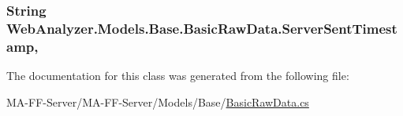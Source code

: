 \subsubsection[{Server\+Sent\+Timestamp}]{\setlength{\rightskip}{0pt plus 5cm}String Web\+Analyzer.\+Models.\+Base.\+Basic\+Raw\+Data.\+Server\+Sent\+Timestamp\hspace{0.3cm}{\ttfamily [get]}, {\ttfamily [set]}}\label{class_web_analyzer_1_1_models_1_1_base_1_1_basic_raw_data_a21d2fe8ffde6c6af33eef4e81922eecf}


The documentation for this class was generated from the following file\+:\begin{DoxyCompactItemize}
\item 
M\+A-\/\+F\+F-\/\+Server/\+M\+A-\/\+F\+F-\/\+Server/\+Models/\+Base/\hyperlink{_basic_raw_data_8cs}{Basic\+Raw\+Data.\+cs}\end{DoxyCompactItemize}
